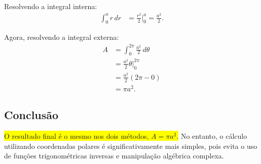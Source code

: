 \documentclass[a4paper,12pt]{article}
\begin{document}
Resolvendo a integral interna:
\begin{align*}
\int_0^a r \, dr &= \frac{r^2}{2} \Big|_0^a = \frac{a^2}{2}.
\end{align*}

Agora, resolvendo a integral externa:
\begin{align*}
A &= \int_0^{2\pi} \frac{a^2}{2} \, d\theta \\
&= \frac{a^2}{2} \theta \Big|_0^{2\pi} \\
&= \frac{a^2}{2} (2\pi - 0) \\
&= \pi a^2.
\end{align*}

\subsection*{Conclusão}
\colorbox{yellow}{O resultado final é o mesmo nos dois métodos, $A = \pi a^2$.} No entanto, o cálculo utilizando 
coordenadas polares é significativamente mais simples, pois evita o uso de funções trigonométricas 
inversas e manipulação algébrica complexa.
    
\end{document}

